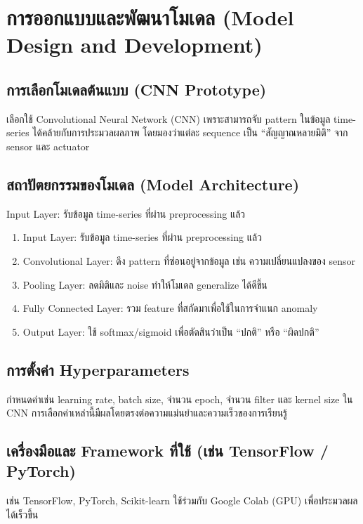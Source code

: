 \section{การออกแบบและพัฒนาโมเดล (Model Design and Development)}

\subsection{การเลือกโมเดลต้นแบบ (CNN Prototype)}
\hspace{2em} เลือกใช้ Convolutional Neural Network (CNN) เพราะสามารถจับ pattern ในข้อมูล time-series ได้คล้ายกับการประมวลผลภาพ โดยมองว่าแต่ละ sequence เป็น “สัญญาณหลายมิติ” จาก sensor และ actuator

\subsection{สถาปัตยกรรมของโมเดล (Model Architecture)}
\hspace{2em} Input Layer: รับข้อมูล time-series ที่ผ่าน preprocessing แล้ว
\begin{enumerate}
  \item Input Layer: รับข้อมูล time-series ที่ผ่าน preprocessing แล้ว
  \item Convolutional Layer: ดึง pattern ที่ซ่อนอยู่จากข้อมูล เช่น ความเปลี่ยนแปลงของ sensor
  \item Pooling Layer: ลดมิติและ noise ทำให้โมเดล generalize ได้ดีขึ้น
  \item Fully Connected Layer: รวม feature ที่สกัดมาเพื่อใช้ในการจำแนก anomaly
  \item Output Layer: ใช้ softmax/sigmoid เพื่อตัดสินว่าเป็น “ปกติ” หรือ “ผิดปกติ”
\end{enumerate}

\subsection{การตั้งค่า Hyperparameters}
\hspace{2em} กำหนดค่าเช่น learning rate, batch size, จำนวน epoch, จำนวน filter และ kernel size ใน CNN การเลือกค่าเหล่านี้มีผลโดยตรงต่อความแม่นยำและความเร็วของการเรียนรู้

\subsection{เครื่องมือและ Framework ที่ใช้ (เช่น TensorFlow / PyTorch)}
\hspace{2em} เช่น TensorFlow, PyTorch, Scikit-learn ใช้ร่วมกับ Google Colab (GPU) เพื่อประมวลผลได้เร็วขึ้น

